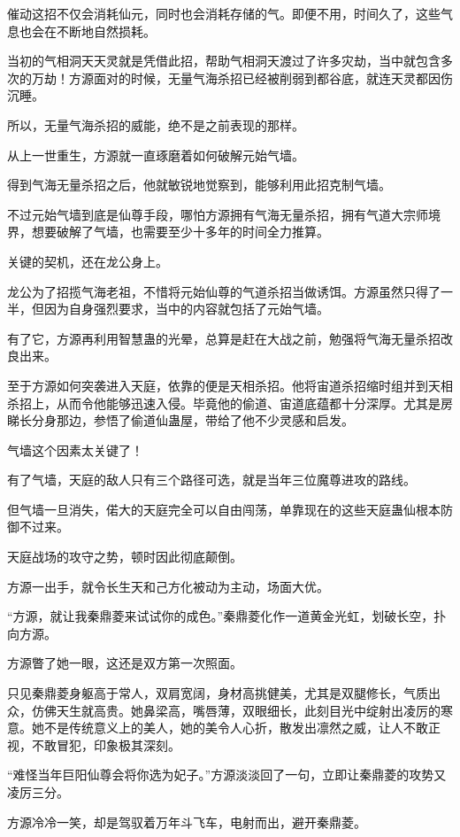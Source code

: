 \begin{this_body}
催动这招不仅会消耗仙元，同时也会消耗存储的气。即便不用，时间久了，这些气息也会在不断地自然损耗。

当初的气相洞天天灵就是凭借此招，帮助气相洞天渡过了许多灾劫，当中就包含多次的万劫！方源面对的时候，无量气海杀招已经被削弱到都谷底，就连天灵都因伤沉睡。

所以，无量气海杀招的威能，绝不是之前表现的那样。

从上一世重生，方源就一直琢磨着如何破解元始气墙。

得到气海无量杀招之后，他就敏锐地觉察到，能够利用此招克制气墙。

不过元始气墙到底是仙尊手段，哪怕方源拥有气海无量杀招，拥有气道大宗师境界，想要破解了气墙，也需要至少十多年的时间全力推算。

关键的契机，还在龙公身上。

龙公为了招揽气海老祖，不惜将元始仙尊的气道杀招当做诱饵。方源虽然只得了一半，但因为自身强烈要求，当中的内容就包括了元始气墙。

有了它，方源再利用智慧蛊的光晕，总算是赶在大战之前，勉强将气海无量杀招改良出来。

至于方源如何突袭进入天庭，依靠的便是天相杀招。他将宙道杀招缩时组并到天相杀招上，从而令他能够迅速入侵。毕竟他的偷道、宙道底蕴都十分深厚。尤其是房睇长分身那边，参悟了偷道仙蛊屋，带给了他不少灵感和启发。

气墙这个因素太关键了！

有了气墙，天庭的敌人只有三个路径可选，就是当年三位魔尊进攻的路线。

但气墙一旦消失，偌大的天庭完全可以自由闯荡，单靠现在的这些天庭蛊仙根本防御不过来。

天庭战场的攻守之势，顿时因此彻底颠倒。

方源一出手，就令长生天和己方化被动为主动，场面大优。

“方源，就让我秦鼎菱来试试你的成色。”秦鼎菱化作一道黄金光虹，划破长空，扑向方源。

方源瞥了她一眼，这还是双方第一次照面。

只见秦鼎菱身躯高于常人，双肩宽阔，身材高挑健美，尤其是双腿修长，气质出众，仿佛天生就高贵。她鼻梁高，嘴唇薄，双眼细长，此刻目光中绽射出凌厉的寒意。她不是传统意义上的美人，她的美令人心折，散发出凛然之威，让人不敢正视，不敢冒犯，印象极其深刻。

“难怪当年巨阳仙尊会将你选为妃子。”方源淡淡回了一句，立即让秦鼎菱的攻势又凌厉三分。

方源冷冷一笑，却是驾驭着万年斗飞车，电射而出，避开秦鼎菱。


\end{this_body}

